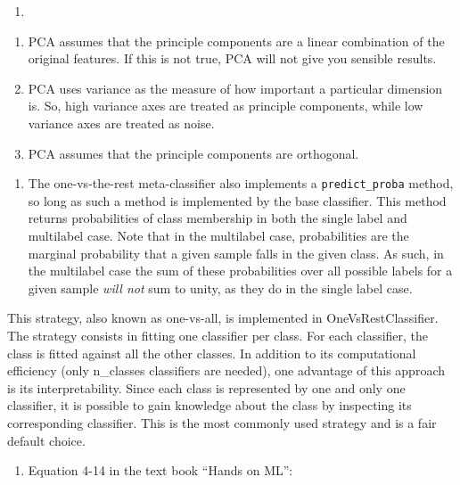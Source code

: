 \documentclass[11pt]{article}
\providecommand{\tightlist}{%
      \setlength{\itemsep}{0pt}\setlength{\parskip}{0pt}}
\begin{document}
    \begin{enumerate}
\def\labelenumi{\alph{enumi})}
\setcounter{enumi}{3}
\item
\end{enumerate}

\begin{enumerate}
\def\labelenumi{\arabic{enumi}.}
\tightlist
\item
  PCA assumes that the principle components are a linear combination of
  the original features. If this is not true, PCA will not give you
  sensible results.\\
\item
  PCA uses variance as the measure of how important a particular
  dimension is. So, high variance axes are treated as principle
  components, while low variance axes are treated as noise.\\
\item
  PCA assumes that the principle components are orthogonal.
\end{enumerate}

    \begin{enumerate}
\def\labelenumi{\alph{enumi})}
\setcounter{enumi}{4}
\tightlist
\item
  The one-vs-the-rest meta-classifier also implements a
  \texttt{predict\_proba} method, so long as such a method is
  implemented by the base classifier. This method returns probabilities
  of class membership in both the single label and multilabel case. Note
  that in the multilabel case, probabilities are the marginal
  probability that a given sample falls in the given class. As such, in
  the multilabel case the sum of these probabilities over all possible
  labels for a given sample \emph{will not} sum to unity, as they do in
  the single label case.
\end{enumerate}

This strategy, also known as one-vs-all, is implemented in
OneVsRestClassifier. The strategy consists in fitting one classifier per
class. For each classifier, the class is fitted against all the other
classes. In addition to its computational efficiency (only n\_classes
classifiers are needed), one advantage of this approach is its
interpretability. Since each class is represented by one and only one
classifier, it is possible to gain knowledge about the class by
inspecting its corresponding classifier. This is the most commonly used
strategy and is a fair default choice.

    \begin{enumerate}
\def\labelenumi{\alph{enumi})}
\setcounter{enumi}{5}
\tightlist
\item
  Equation 4-14 in the text book ``Hands on ML'':
\end{enumerate}
\end{document}
